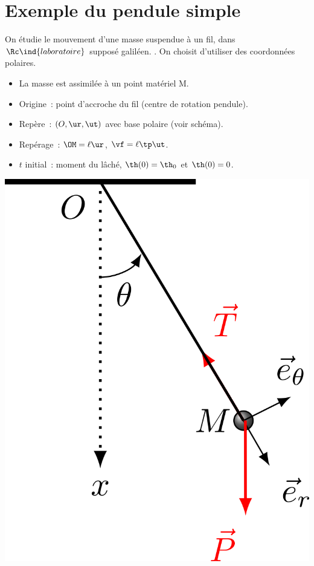 \documentclass[../../main/main.tex]{subfiles}
\begin{document}
\section{Exemple du pendule simple}
\hspace*{-0.75cm}
\begin{minipage}{0.70\linewidth}
	\begin{enumerate}[label=\sqenumi]
		 On étudie le mouvement d'une masse
		suspendue à un fil, dans $\Rc\ind{laboratoire}$ supposé galiléen.
		.
		 On choisit d'utiliser des coordonnées polaires.
		\begin{itemize}
			\item La masse est assimilée à un point matériel M.
			\item Origine~: point d'accroche du fil (centre de rotation
			      pendule).
			\item Repère~: $(O,\ur,\ut)$ avec base polaire (voir schéma).
			\item Repérage~: $\OM = \ell\ur$, $\vf = \ell\tp\ut$.
			\item $t$ initial~: moment du lâché, $\th(0) = \th_0$ et
			      $\th(0) = 0$.
		\end{itemize}
	\end{enumerate}
\end{minipage}
\hfill
\begin{minipage}{0.25\linewidth}
	\begin{center}
		\includegraphics[width=\linewidth]{pendule_plain}
	\end{center}
\end{minipage}
\end{document}
